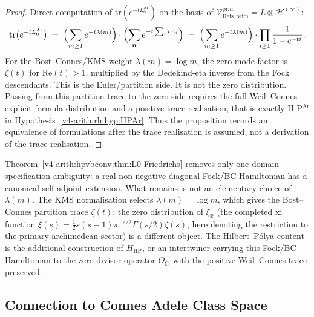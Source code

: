\begin{proof}
Direct computation of \(\mathrm{tr}(e^{-tL_{0}^{\mathrm{Ar}}})\) on the
basis of \(\mathcal{V}^{\mathrm{prim}}_{\mathrm{Heis},\mathrm{prim}}=L\otimes\mathcal{H}^{(\infty)}\):
\begin{equation*}
\mathrm{tr}\bigl(e^{-tL_{0}^{\mathrm{Ar}}}\bigr)\;=\;\Bigl(\sum_{m\geq
1}e^{-t\lambda(m)}\Bigr)\cdot\Bigl(\sum_{\mathbf{n}}e^{-t\sum_{i}i\,n_{i}}\Bigr)\;=\;\Bigl(\sum_{m\geq
1}e^{-t\lambda(m)}\Bigr)\cdot\prod_{i\geq 1}\frac{1}{1-e^{-ti}}.
\end{equation*}
For the Bost--Connes/KMS weight \(\lambda(m)=\log m\), the
zero-mode factor is \(\zeta(t)\) for \(\mathrm{Re}(t)>1\), multiplied
by the Dedekind-eta inverse from the Fock descendants. This is the
Euler/partition side. It is not the zero distribution. Passing from
this partition trace to the zero side requires the full
Weil--Connes explicit-formula distribution and a positive trace
realisation; that is exactly H-P\(^{\mathrm{Ar}}\) in
Hypothesis~\ref{v4-arith:rh:hyp:HPAr}. Thus the proposition records an
equivalence of formulations after the trace realisation is assumed,
not a derivation of the trace realisation.
\end{proof}

\begin{remark}
\label{v4-arith:hpvbconv:rem:friedrichs-gain}
Theorem~\ref{v4-arith:hpvbconv:thm:L0-Friedrichs} removes only one
domain-specification ambiguity: a real non-negative diagonal
Fock/BC Hamiltonian has a canonical self-adjoint extension. What
remains is not an elementary choice of \(\lambda(m)\). The KMS
normalisation selects \(\lambda(m)=\log m\), which gives the
Bost--Connes partition trace \(\zeta(t)\); the zero distribution of
\(\xi_{\mathbb{R}}\) (the completed xi function
\(\xi(s)=\tfrac{1}{2}s(s-1)\pi^{-s/2}\Gamma(s/2)\zeta(s)\),
here denoting the restriction to the primary archimedean sector) is a different object. The Hilbert--P\'olya
content is the additional construction of \(H_{\mathrm{HP}}\), or an
intertwiner carrying this Fock/BC Hamiltonian to the zero-divisor operator
\(\Theta_{\xi}\), with the positive Weil--Connes trace preserved.
\end{remark}

\subsection{Connection to Connes Adele Class Space}
\label{v4-arith:hpvbconv:connes-connection}

